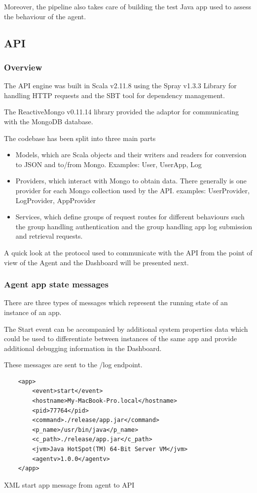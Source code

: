 Moreover, the pipeline also takes care of building the test Java app used to assess the behaviour of the agent.


\subsection{API}
\subsubsection{Overview}
The API engine was built in Scala v2.11.8 using the Spray v1.3.3 Library for handling HTTP requests and the SBT tool for dependency management.

The ReactiveMongo v0.11.14 library provided the adaptor for communicating with the MongoDB database.

The codebase has been split into three main parts
\begin{itemize}
  \item Models, which are Scala objects and their writers and readers for conversion to JSON and to/from Mongo. Examples: User, UserApp, Log
  \item Providers, which interact with Mongo to obtain data. There generally is one provider for each Mongo collection used by the API. examples: UserProvider, LogProvider, AppProvider 
  \item Services, which define groups of request routes for different behaviours such the group handling authentication and the group handling app log submission and retrieval requests.
\end{itemize}


A quick look at the protocol used to communicate with the API from the point of view of the Agent and the Dashboard will be presented next.

\subsubsection{Agent app state messages}
There are three types of messages which represent the running state of an instance of an app.

The Start event can be accompanied by additional system properties data which could be used to differentiate between instances of the same app and provide additional debugging information in the Dashboard.

These messages are sent to the /log endpoint.

\begin{listing}[H]
\begin{verbatim}
    <app>
        <event>start</event>
        <hostname>My-MacBook-Pro.local</hostname>
        <pid>77764</pid>
        <command>./release/app.jar</command>
        <p_name>/usr/bin/java</p_name>
        <c_path>./release/app.jar</c_path>
        <jvm>Java HotSpot(TM) 64-Bit Server VM</jvm>
        <agentv>1.0.0</agentv>
    </app>
\end{verbatim}
\caption{XML start app message from agent to API}
\end{listing}



